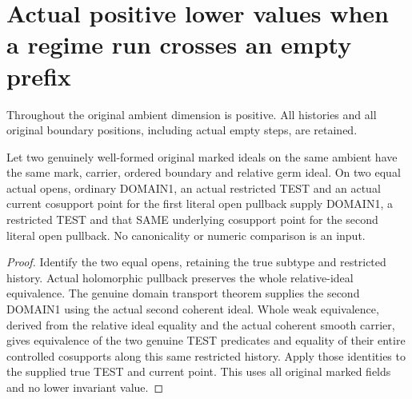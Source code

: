 \section{Actual positive lower values when a regime run crosses an empty prefix}

Throughout the original ambient dimension is positive. All histories and all
original boundary positions, including actual empty steps, are retained.

\begin{lemma}
\label{hir:original-positive-empty-prefix-base-geometry}
\leanok
Let two genuinely well-formed original marked ideals on the same ambient
have the same mark, carrier, ordered boundary and relative germ ideal.
On two equal actual opens, ordinary DOMAIN1, an actual restricted TEST and
an actual current cosupport point for the first literal open pullback
supply DOMAIN1, a restricted TEST and that SAME underlying cosupport point
for the second literal open pullback. No canonicality or numeric comparison
is an input.
\end{lemma}
\begin{proof}
Identify the two equal opens, retaining the true subtype and restricted
history. Actual holomorphic pullback preserves the whole relative-ideal
equivalence. The genuine domain transport theorem supplies the second
DOMAIN1 using the actual second coherent ideal. Whole weak equivalence,
derived from the relative ideal equality and the actual coherent smooth
carrier, gives equivalence of the two genuine TEST predicates and equality
of their entire controlled cosupports along this same restricted history.
Apply those identities to the supplied true TEST and current point. This
uses all original marked fields and no lower invariant value.
\end{proof}

